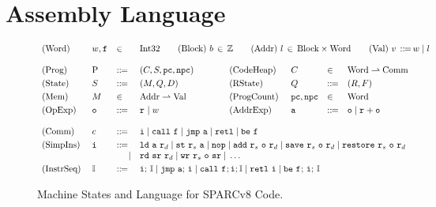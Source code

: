 \section{\sparc{} Assembly Language}
\label{sec:modeling}
\begin{figure}[!t]
	\centering
	\small
	\[
		\begin{array}{llllcllll}
			\TYPE{(Word)} & \word, \lab{} & \in &
			\multicolumn{6}{l}
			{
				\TYPE{Int32} \qquad
				\TYPE{(Block)} \ \block \, \in \, \Ztype
				\qquad
				\TYPE{(Addr)} \ \loc \, \in \,
					\TYPE{Block} \times \TYPE{Word}
				\qquad
				\TYPE{(Val)} \ \val \,
					\define \, \word \sepline \loc
			}
			\\
			\\
			\TYPE{(Prog)} & \prog & \define &
				(\code, \state, \pc, \npc) & \qquad &
			\TYPE{(CodeHeap)} \ \ & \code \ & \in &
				\TYPE{Word} \rightharpoonup \TYPE{Comm}
			\\
			\\[-9pt]
			\TYPE{(State)} & \state & \define &
				(\mem, \Rstate, \DBuf) & &
			\TYPE{(RState)} & \Rstate & \define &
				(\RFile, \Wstack)
			\\
			\\[-9pt]
			\TYPE{(Mem)} & \mem & \in &
				\TYPE{Addr} \rightharpoonup \TYPE{Val}
			& &
			\TYPE{(ProgCount)} & \pc, \npc & \in & \TYPE{Word}
			\\
			\\[-9pt]
			\TYPE{(OpExp)} & \oexp & \define &
				\reg{} \sepline \word & &
			\TYPE{(AddrExp)} & \aexp & \define &
				\oexp \sepline \reg{} + \oexp \\
			\\
			\TYPE{(Comm)} & \comm & \define &
			\multicolumn{6}{l}
			{
				\simplins{} \sepline \call{} \ \lab{}
				\sepline \jmp{} \ \aexp \sepline \retl{} \sepline
				\be \ \lab{}
			} \\
			\\[-9pt]
			\TYPE{(SimpIns)} \ & \simplins{} & \define &
			\multicolumn{6}{l}
			{
				\ld{} \ \aexp \ \reg{d} \sepline
				\st{} \ \reg{s} \ \aexp \sepline
				\nop{} \sepline
				\cadd{} \ \reg{s} \ \oexp \ \reg{d} \sepline
				\csave{} \ \reg{s} \ \oexp \ \reg{d} \sepline
				\crestore{} \ \reg{s} \ \oexp \ \reg{d}
			} \\
			& & \ \ \ \ | &
			\multicolumn{6}{l}
			{
				\rd{} \ \sr \ \reg{d} \sepline
				\cwr{} \ \reg{s} \ \oexp \ \sr \sepline
				\dots
			} \\
			\\[-9pt]
			\TYPE{(InstrSeq)} & \cblk & \define &
			\multicolumn{6}{l}
			{
				\simplins{}; \, \cblk \sepline
				\jmp{} \ \aexp; \, \simplins{} \sepline
				\call{} \ \lab{}; \simplins{}; \cblk \sepline
				\retl{} \ \simplins{} \sepline
				\be{} \ \lab{}; \, \simplins{}; \, \cblk
			}
		\end{array}
	\]
	\vspace*{-0.5em}
	\caption{Machine States and Language for SPARCv8 Code.}
	\label {fig:Machine States and Language for SPARC Code}
	\vspace*{-0.5em}
\end{figure}

